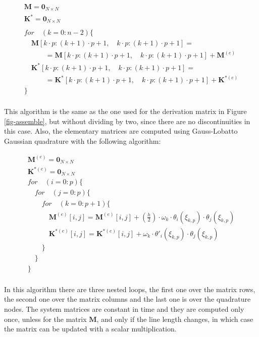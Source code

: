 \documentclass[10pt] {article}
\newcommand{\ba}{\begin{array}}
\newcommand{\ea}{\end{array}}
\begin{document}
$$
\ba{l}
\mathbf{M} = \mathbf{0}_{N\times N} \\
\mathbf{K}^* = \mathbf{0}_{N\times N} \\
\quad \\
for \quad (k=0:n-2)\{ \\
\quad \mathbf{M}[ k\cdot p:(k+1)\cdot p+1,\quad k\cdot p:(k+1)\cdot p+1 ] =  \\
\quad \quad \quad =\mathbf{M}[ k\cdot p:(k+1)\cdot p+1,\quad k\cdot p:(k+1)\cdot p+1 ] + \mathbf{M}^{(e)} \\
\quad \mathbf{K}^*[ k\cdot p:(k+1)\cdot p+1,\quad k\cdot p:(k+1)\cdot p+1 ] =  \\
\quad \quad \quad =\mathbf{K}^*[ k\cdot p:(k+1)\cdot p+1,\quad k\cdot p:(k+1)\cdot p+1 ] + \mathbf{K}^{*(e)} \\
\} \\
\ea
$$

This algorithm is the same as the one used for the derivation matrix in Figure \ref{fig-assemble}, but without dividing by two, since there are no discontinuities in this case. Also, the elementary matrices are computed using Gauss-Lobatto Gaussian quadrature with the following algorithm:

$$
\ba{l}
\mathbf{M}^{(e)} = \mathbf{0}_{N\times N} \\
\mathbf{K}^{*(e)} = \mathbf{0}_{N\times N} \\
for \quad (i=0:p)\{ \\
\quad for \quad (j=0:p)\{ \\
\quad \quad for \quad (k=0:p+1)\{ \\
\quad \quad \quad \mathbf{M}^{(e)}[i,j] = \mathbf{M}^{(e)}[i,j] +  \left(\frac{h}{2}\right)\cdot\omega_k\cdot\theta_i(\xi_{k,p})\cdot\theta_j(\xi_{k,p})\\
\quad \quad \quad \mathbf{K}^{*(e)}[i,j] = \mathbf{K}^{*(e)}[i,j] +  \omega_k\cdot\theta'_i(\xi_{k,p})\cdot\theta_j(\xi_{k,p})\\
\quad \quad \} \\
\quad \} \\
\} \\
\ea
$$

In this algorithm there are three nested loops, the first one over the matrix rows, the second one over the matrix columns and the last one is over the quadrature nodes. The system matrices are constant in time and they are computed only once, unless for the matrix $\mathbf{M}$, and only if the line length changes, in which case the matrix can be updated with a scalar multiplication.\\
\end{document}
